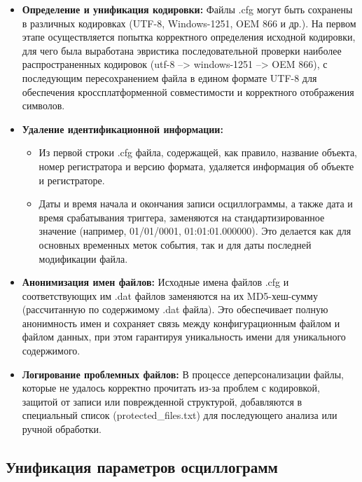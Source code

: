 \begin{itemize}[itemsep=2pt,topsep=2pt]
  \item \textbf{Определение и унификация кодировки:} Файлы .cfg могут быть сохранены в различных кодировках (UTF-8, Windows-1251, OEM 866 и др.). На первом этапе осуществляется попытка корректного определения исходной кодировки, для чего была выработана эвристика последовательной проверки наиболее распространенных кодировок (utf-8 --\textgreater{} windows-1251 --\textgreater{} OEM 866), с последующим пересохранением файла в едином формате UTF-8 для обеспечения кроссплатформенной совместимости и корректного отображения символов.
  \item \textbf{Удаление идентификационной информации:}
  \begin{itemize}[itemsep=2pt,topsep=2pt]
    \item Из первой строки .cfg файла, содержащей, как правило, название объекта, номер регистратора и версию формата, удаляется информация об объекте и регистраторе.
    \item Даты и время начала и окончания записи осциллограммы, а также дата и время срабатывания триггера, заменяются на стандартизированное значение (например, 01/01/0001, 01:01:01.000000). Это делается как для основных временных меток события, так и для даты последней модификации файла.
  \end{itemize}
  \item \textbf{Анонимизация имен файлов:} Исходные имена файлов .cfg и соответствующих им .dat файлов заменяются на их MD5-хеш-сумму (рассчитанную по содержимому .dat файла). Это обеспечивает полную анонимность имен и сохраняет связь между конфигурационным файлом и файлом данных, при этом гарантируя уникальность имени для уникального содержимого.
  \item \textbf{Логирование проблемных файлов:} В процессе деперсонализации файлы, которые не удалось корректно прочитать из-за проблем с кодировкой, защитой от записи или поврежденной структурой, добавляются в специальный список (protect\allowbreak ed\_\allowbreak files.txt) для последующего анализа или ручной обработки.
\end{itemize}\par\vspace{0.2cm}

\subsection{Унификация параметров осциллограмм}\label{sec:ch3_parameters_unification}

